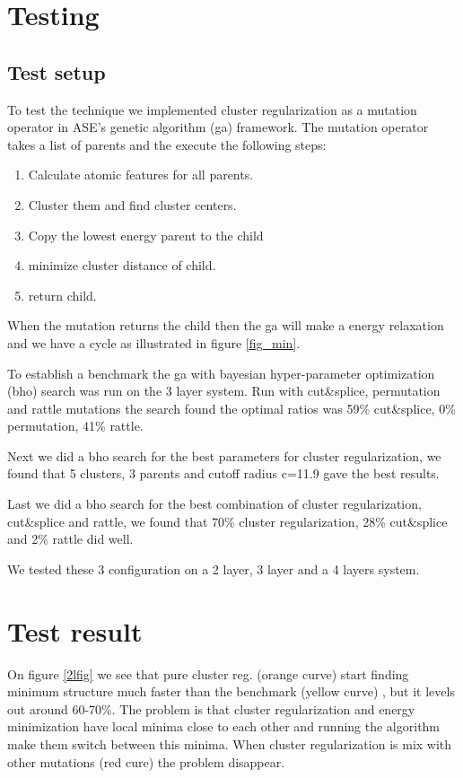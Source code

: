 \documentclass[%
 aps,
 prl,%
 amsmath,amssymb,
 reprint,%
]{revtex4-1}
\begin{document}
\section{Testing}

\subsection{Test setup}
To test the technique we implemented cluster regularization as a mutation operator in ASE's genetic algorithm (ga)\cite{ase_ga} framework. 
The mutation operator takes a list of parents and the execute the following steps:
\begin{enumerate}
\item Calculate atomic features for all parents.
\item Cluster them and find cluster centers.
\item Copy the lowest energy parent to the child
\item minimize cluster distance of child.
\item return child.
\end{enumerate}
When the mutation returns the child then the ga will make a energy relaxation 
and we have a cycle as illustrated in figure \ref{fig_min}.

To establish a benchmark the ga with bayesian hyper-parameter optimization (bho) search was run on the 3 layer system.
Run with cut\&splice, permutation and rattle mutations the search found the optimal ratios was 59\% cut\&splice, 0\% permutation, 41\% rattle. 

Next we did a bho search for the best parameters for cluster regularization, we found that 5 clusters, 3 parents and cutoff radius c=11.9 gave the best results.

Last we did a bho search for the best combination of cluster regularization, cut\&splice and rattle, we found that 70\% cluster regularization, 28\% cut\&splice and 2\% rattle did well.

We tested these 3 configuration on a 2 layer, 3 layer and a 4 layers system. 

\section{Test result}

On figure \ref{2lfig} we see that pure cluster reg. (orange curve) start finding minimum structure much faster than the benchmark (yellow curve) , but it levels out around 60-70\%. The problem is that cluster regularization and energy minimization have local minima close to each other and running the algorithm make them switch between this minima. When cluster regularization is mix with other mutations (red cure) the problem disappear. 
\end{document}
